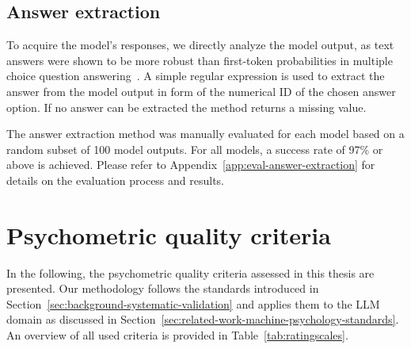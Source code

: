 \documentclass{DESSThesis}
\begin{document}
\subsection{Answer extraction}
\label{sec:answer-extraction}

To acquire the model's responses, we directly analyze the model output, as text answers were shown to be more robust than first-token probabilities in multiple choice question answering~\cite{wang_look_2024, wang_my_2024}. A simple regular expression is used to extract the answer from the model output in form of the numerical ID of the chosen answer option. If no answer can be extracted the method returns a missing value.

The answer extraction method was manually evaluated for each model based on a random subset of 100 model outputs. For all models, a success rate of 97\% or above is achieved. Please refer to Appendix~\ref{app:eval-answer-extraction} for details on the evaluation process and results.


\section{Psychometric quality criteria}
\label{sec:quality-criteria}

In the following, the psychometric quality criteria assessed in this thesis are presented. Our methodology follows the standards introduced in Section~\ref{sec:background-systematic-validation} and applies them to the LLM domain as discussed in Section~\ref{sec:related-work-machine-psychology-standards}. An overview of all used criteria is provided in Table~\ref{tab:ratingscales}.
\end{document}
